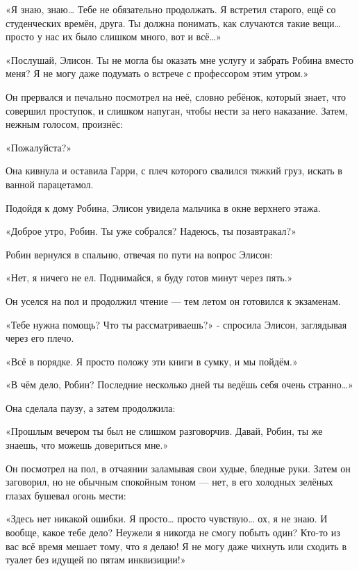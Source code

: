 \documentclass[a4paper,12pt]{book}
\begin{document}
\par
«Я знаю, знаю… Тебе не обязательно продолжать. Я встретил старого, ещё со студенческих времён, друга. Ты должна понимать, как случаются такие вещи… просто у нас их было слишком много, вот и всё…»
\par
«Послушай, Элисон. Ты не могла бы оказать мне услугу и забрать Робина вместо меня? Я не могу даже подумать о встрече с профессором этим утром.»
\par
Он прервался и печально посмотрел на неё, словно ребёнок, который знает, что совершил проступок, и слишком напуган, чтобы нести за него наказание. Затем, нежным голосом, произнёс:
\par
«Пожалуйста?»
\par
Она кивнула и оставила Гарри, с плеч которого свалился тяжкий груз, искать в ванной парацетамол.\\
\par
Подойдя к дому Робина, Элисон увидела мальчика в окне верхнего этажа.
\par
«Доброе утро, Робин. Ты уже собрался? Надеюсь, ты позавтракал?»
\par
Робин вернулся в спальню, отвечая по пути на вопрос Элисон:
\par
«Нет, я ничего не ел. Поднимайся, я буду готов минут через пять.»
\par
Он уселся на пол и продолжил чтение — тем летом он готовился к экзаменам.
\par
«Тебе нужна помощь? Что ты рассматриваешь?» - спросила Элисон, заглядывая через его плечо.
\par
«Всё в порядке. Я просто положу эти книги в сумку, и мы пойдём.»
\par
«В чём дело, Робин? Последние несколько дней ты ведёшь себя очень странно…»
\par
Она сделала паузу, а затем продолжила:
\par
«Прошлым вечером ты был не слишком разговорчив. Давай, Робин, ты же знаешь, что можешь довериться мне.»
\par
Он посмотрел на пол, в отчаянии заламывая свои худые, бледные руки. Затем он заговорил, но не обычным спокойным тоном — нет, в его холодных зелёных глазах бушевал огонь мести:
\par
«Здесь нет никакой ошибки. Я просто… просто чувствую… ох, я не знаю. И вообще, какое тебе дело? Неужели я никогда не смогу побыть один? Кто-то из вас всё время мешает тому, что я делаю! Я не могу даже чихнуть или сходить в туалет без идущей по пятам инквизиции!»
\par
\end{document}
